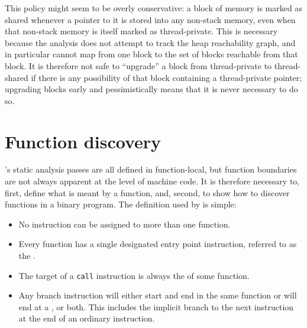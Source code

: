  This policy might seem to be
overly conservative: a block of memory is marked as shared whenever a
pointer to it is stored into any non-stack memory, even when that
non-stack memory is itself marked as thread-private.  This is
necessary because the analysis does not attempt to track the heap
reachability graph, and in particular cannot map from one block to the
set of blocks reachable from that block.  It is therefore not safe to
``upgrade'' a block from thread-private to thread-shared if there is
any possibility of that block containing a thread-private pointer;
upgrading blocks early and pessimistically means that it is never
necessary to do so.

\section{Function discovery}
\label{sect:program_model:functions}



{\Technique}'s static analysis passes are all defined in function-local, but
function boundaries are not always apparent at the level of machine
code.  It is therefore necessary to, first, define what is meant by a
function, and, second, to show how to discover functions in a binary
program.  The definition used by {\technique} is simple:

\begin{itemize}
\item
  No instruction can be assigned to more than one function.
\item
  Every function has a single designated entry point instruction,
  referred to as the .
\item
  The target of a \texttt{call} instruction is always the
   of some function.  
\item
  Any branch instruction will either start and end in the same
  function or will end at a , or both.  This
  includes the implicit branch to the next instruction at the end of
  an ordinary instruction.
\end{itemize}

